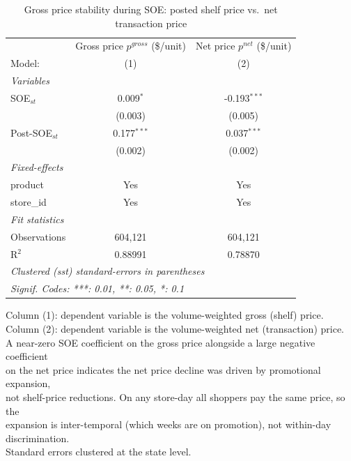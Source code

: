 
\begin{table}[htbp]
   \caption{\label{tab:gross_price_stability} Gross price stability during SOE: posted shelf price vs.\ net transaction price}
   \centering
   \begin{tabular}{lcc}
      \tabularnewline \midrule \midrule
                      & Gross price $p^{gross}$ (\$/unit)  & Net price $p^{net}$ (\$/unit) \\    
      Model:          & (1)                                & (2)\\  
      \midrule
      \emph{Variables}\\
      SOE$_{st}$      & 0.009$^{*}$                        & -0.193$^{***}$\\   
                      & (0.003)                            & (0.005)\\   
      Post-SOE$_{st}$ & 0.177$^{***}$                      & 0.037$^{***}$\\   
                      & (0.002)                            & (0.002)\\   
      \midrule
      \emph{Fixed-effects}\\
      product         & Yes                                & Yes\\  
      store\_id       & Yes                                & Yes\\  
      \midrule
      \emph{Fit statistics}\\
      Observations    & 604,121                            & 604,121\\  
      R$^2$           & 0.88991                            & 0.78870\\  
      \midrule \midrule
      \multicolumn{3}{l}{\emph{Clustered (sst) standard-errors in parentheses}}\\
      \multicolumn{3}{l}{\emph{Signif. Codes: ***: 0.01, **: 0.05, *: 0.1}}\\
   \end{tabular}
   
   \par \raggedright 
   Column (1): dependent variable is the volume-weighted gross (shelf) price.\\
   Column (2): dependent variable is the volume-weighted net (transaction) price.\\
   A near-zero SOE coefficient on the gross price alongside a large negative coefficient\\
   on the net price indicates the net price decline was driven by promotional expansion,\\
   not shelf-price reductions. On any store-day all shoppers pay the same price, so the\\
   expansion is inter-temporal (which weeks are on promotion), not within-day discrimination.\\
   Standard errors clustered at the state level.
\end{table}


